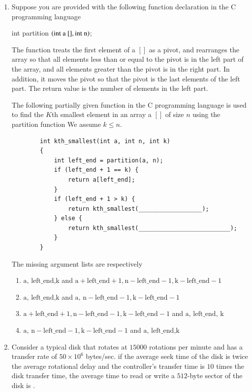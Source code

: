 \documentclass[journal,12pt,onecolumn]{IEEEtran}
\theoremstyle{remark}
\begin{document}
\begin{enumerate}
		\item Suppose you are provided with the following function declaration in the C programming language
		
		int partition $\left(\text{int a } [ ], \text{int n}\right)$;
		
		The function treats the first element of a $[ ]$ as a pivot, and rearranges the array so that all elements less than or equal to the pivot is in the left part of the array, and all elements greater than the pivot is in the right part. In addition, it moves the pivot so that the pivot is the last elements of the left part. The return value is the number of elements in the left part.
		
		The following partially given function in the C programming language is used to find the $K$th smallest element in an array a $[ ]$ of size $n$ using the partition function We assume $k \leq n$.
		
	\begin{verbatim}
		int kth_smallest(int a, int n, int k)
		{
			int left_end = partition(a, n);
			if (left_end + 1 == k) {
				return a[left_end];
			}
			if (left_end + 1 > k) {
				return kth_smallest(__________________);
			} else {
				return kth_smallest(__________________________);
			}
		}
	\end{verbatim}
		
		The missing argument lists are respectively
		
		\hfill{}
		
		\begin{enumerate}
			\item $\text{a, left\_end,k}$ and $\text{a} + \text{left\_end} + 1, \text{n} - \text{left\_end} - 1, \text{k} - \text{left\_end} - 1$
			\item $\text{a, left\_end,k}$ and $\text{a, n} - \text{left\_end} - 1, \text{k} - \text{left\_end} - 1$
			\item $\text{a} + \text{left\_end} + 1,\text{n} - \text{left\_end} - 1, \text{k} - \text{left\_end} - 1$ and $\text{a, left\_end, k}$
			\item $\text{a, n} - \text{left\_end} - 1, \text{k} - \text{left\_end} - 1$ and $\text{a, left\_end,k}$
		\end{enumerate}
		
		\item Consider a typical disk that rotates at $15000$ rotations per minute  and has a transfer rate of $50 \times 10^6$ bytes/sec. if the average seek time of the disk is twice the average rotational delay and the controller's transfer time is $10$ times the disk transfer time, the average time  to read or write a $512$-byte sector of the disk is \underline{\hspace{2cm}}.
		

\end{enumerate}
\end{document}
